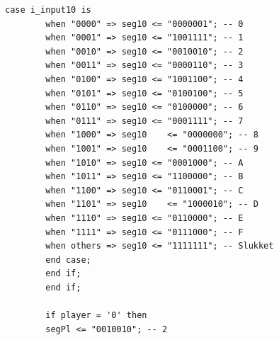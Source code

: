 \begin{enumerate}
\begin{lstlisting}[caption={Behavioral style kode for Guessgame},label={lst:Guessgame}]
		case i_input10 is
		when "0000" => seg10 <= "0000001"; -- 0
		when "0001" => seg10 <= "1001111"; -- 1
		when "0010" => seg10 <= "0010010"; -- 2
		when "0011" => seg10 <= "0000110"; -- 3
		when "0100" => seg10 <= "1001100"; -- 4
		when "0101" => seg10 <= "0100100"; -- 5
		when "0110" => seg10 <= "0100000"; -- 6
		when "0111" => seg10 <= "0001111"; -- 7
		when "1000" => seg10	<= "0000000"; -- 8
		when "1001" => seg10	<= "0001100"; -- 9
		when "1010" => seg10 <= "0001000"; -- A
		when "1011" => seg10 <= "1100000"; -- B
		when "1100" => seg10 <= "0110001"; -- C
		when "1101" => seg10	<= "1000010"; -- D
		when "1110" => seg10 <= "0110000"; -- E
		when "1111" => seg10 <= "0111000"; -- F
		when others => seg10 <= "1111111"; -- Slukket
		end case;
		end if;
		end if;
		
		if player = '0' then
		segPl <= "0010010"; -- 2
		

\end{lstlisting}
\end{enumerate}

